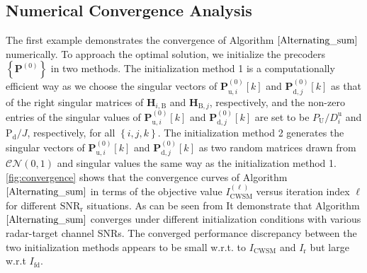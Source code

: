 \documentclass[9pt,journal]{IEEEtran}
\newcommand{\paren}[1]{\left({#1}\right)}
\newcommand{\bracket}[1]{{\left [{#1}\right ]}}
\newcommand{\braces}[1]{{\left\{ {#1}\right\}}}
\newcommand{\rr}{_\mathrm{r}}
\newcommand{\HBj}{\mathbf{H}_{\textrm{B},j}}
\newcommand{\HiB}{\mathbf{H}_{i,\textrm{B}}}
\newcommand{\sfrac}[2]{#1/#2}
\begin{document}
\subsection{Numerical Convergence Analysis}
\label{sec:convergence}
The first example demonstrates the convergence of Algorithm $\ref{Alternating_sum}$ numerically. To approach the optimal solution, we initialize the precoders $\braces{\mathbf{P}^{\paren{0}}}$ in two methods. The initialization method 1 is a computationally efficient way as we choose the singular vectors of  $\mathbf{P}^{\paren{0}}_{\textrm{u},i}\bracket{k}$ and $\mathbf{P}^{\paren{0}}_{\textrm{d},j}\bracket{k}$ as that of the right singular matrices of $\HiB$ and $\HBj$, respectively, and the non-zero entries of the singular values of $\mathbf{P}^{\paren{0}}_{\textrm{u},i}\bracket{k}$ and $\mathbf{P}^{\paren{0}}_{\textrm{d},j}\bracket{k}$ are set to be   $\sfrac{\mathit{P}_\textrm{U}}{D^\textrm{u}_i}$ and $\sfrac{\mathrm{P}_{\textrm{d}}}{\mathit{J}}$, respectively, for all $\braces{i,j,k}$. The initialization method 2 generates the singular vectors of $\mathbf{P}^{\paren{0}}_{\textrm{u},i}\bracket{k}$ and $\mathbf{P}^{\paren{0}}_{\textrm{d},j}\bracket{k}$ as two random matrices drawn from $\mathcal{CN}\paren{0,1}$ and singular values the same way as the initialization method 1. 
\figurename{\;\ref{fig:convergence}} shows that the convergence curves of Algorithm $\ref{Alternating_sum}$ in terms of the objective value $\mathit{I}^{\paren{\ell}}_{\textrm{CWSM}}$ versus iteration index $\ell$ for different $\mathrm{SNR}_{\textrm{r}}$ situations. As can be seen from It demonstrate that Algorithm $\ref{Alternating_sum}$ converges under different initialization conditions with various radar-target channel SNRs. The converged performance discrepancy between the two initialization methods appears to be small w.r.t. to $I_{\textrm{CWSM}}$ and $I_{\textrm{r}}$ but large w.r.t $I_{\textrm{fd}}$.  
\end{document}
